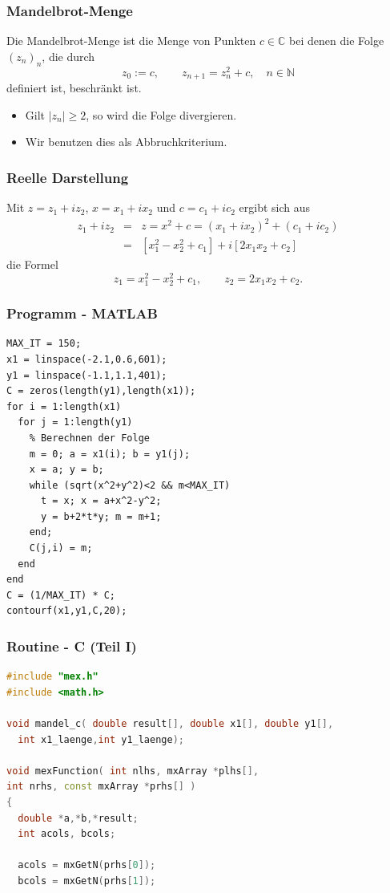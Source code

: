\documentclass[hyperref={xetex}]{beamer}
\begin{document}
\begin{frame}[fragile]\frametitle{Mandelbrot-Menge}
Die Mandelbrot-Menge ist die Menge von Punkten $c \in \mathbb{C}$
bei denen die Folge $(z_n)_n$, die durch
\[ z_0:=c, \qquad  z_{n+1} = z_n^2 +c, \quad n \in \mathbb{N}\]
definiert ist, beschr\"ankt ist.
\begin{itemize}
\item Gilt $|z_n| \geq 2$, so wird die Folge divergieren.
\item Wir benutzen dies als Abbruchkriterium.
\end{itemize}
\end{frame}
\begin{frame}[fragile]\frametitle{Reelle Darstellung}
Mit $z=z_1+iz_2$, $x=x_1+ix_2$ und $c=c_1+ic_2$ ergibt sich aus
\begin{eqnarray*}
z_1 + i z_2 & = & z  =  x^2 + c = (x_1+ix_2)^2 + (c_1+ic_2) \\
& = & [ x_1^2 -x_2^2 +c_1] + i[2 x_1 x_2 +c_2]
\end{eqnarray*}
die Formel
\[ z_1 = x_1^2 -x_2^2 +c_1, \qquad z_2 = 2 x_1 x_2 + c_2. \]
\end{frame}
\begin{frame}[fragile]\frametitle{Programm - MATLAB}
\begin{lstlisting}
MAX_IT = 150;
x1 = linspace(-2.1,0.6,601);
y1 = linspace(-1.1,1.1,401);
C = zeros(length(y1),length(x1));
for i = 1:length(x1)
  for j = 1:length(y1)
    % Berechnen der Folge
    m = 0; a = x1(i); b = y1(j);
    x = a; y = b;
    while (sqrt(x^2+y^2)<2 && m<MAX_IT)
      t = x; x = a+x^2-y^2;
      y = b+2*t*y; m = m+1;
    end;
    C(j,i) = m;
  end
end
C = (1/MAX_IT) * C;
contourf(x1,y1,C,20);
\end{lstlisting}
\end{frame}
\begin{frame}[fragile]\frametitle{Routine - C (Teil I)}
\begin{lstlisting}[language=C++]
#include "mex.h"
#include <math.h>

void mandel_c( double result[], double x1[], double y1[], 
  int x1_laenge,int y1_laenge);

void mexFunction( int nlhs, mxArray *plhs[],
int nrhs, const mxArray *prhs[] )
{
  double *a,*b,*result;
  int acols, bcols;

  acols = mxGetN(prhs[0]);
  bcols = mxGetN(prhs[1]);
\end{lstlisting}
\end{frame}
\end{document}
